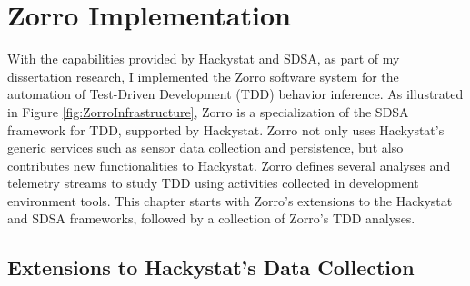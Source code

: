 \chapter{Zorro Implementation}
\label{ch:Zorro}

With the capabilities provided by Hackystat and SDSA, as part of 
my dissertation research, I implemented the Zorro software system 
for the automation of Test-Driven Development (TDD) behavior 
inference. As illustrated in Figure \ref{fig:ZorroInfrastructure}, 
Zorro is a specialization of the SDSA framework for TDD, supported 
by Hackystat. Zorro not only uses Hackystat's generic services such 
as sensor data collection and persistence, but also contributes 
new functionalities to Hackystat. Zorro defines
several analyses and telemetry streams to study TDD using activities 
collected in development environment tools. This chapter starts with 
Zorro's extensions to the Hackystat and SDSA frameworks, followed 
by a collection of Zorro's TDD analyses.

\section{Extensions to Hackystat's Data Collection}
\label{sec:Zorro-Hackystat}

\begin{comment}
A nice thing about Hackystat is that numerous sensors have already 
been developed. Over two dozen sensors are currently available, including 
sensors for IDEs (Emacs, JBuilder, Eclipse, Vim, VisualStudio, Idea), 
configuration management (CVS, Subversion), testing and coverage (JUnit, 
CppUnit, Emma, JBlanket), and so forth. Though availability of tool 
supports gives developers the freedom to choose the right tool for 
a given task without losing process metric data, it is also difficult 
to automate the recognition. Thus, to begin with, Zorro requires that the TDD development 
must be done in a supported IDE. Under this premise, Zorro uses the 
sensor data collected in the IDE, and ignores other development activities
that are probably irrelevant to TDD. 
\end{comment}

